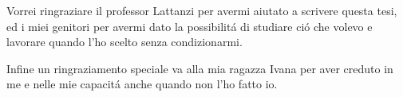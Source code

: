 \documentclass[a4paper,singleside,11pt]{report}
\begin{document}

\copertinatesi 
{}
\indice
\indicefigure
\iniziatesto







\appendix
%


\ringraziamenti
Vorrei ringraziare il professor Lattanzi per avermi aiutato a scrivere questa tesi, ed i miei genitori per avermi dato la possibilit\'a di studiare ci\'o che volevo e lavorare quando l'ho scelto senza condizionarmi.

Infine un ringraziamento speciale va alla mia ragazza Ivana per aver creduto in me e nelle mie capacit\'a anche quando non l'ho fatto io.
\end{document}
